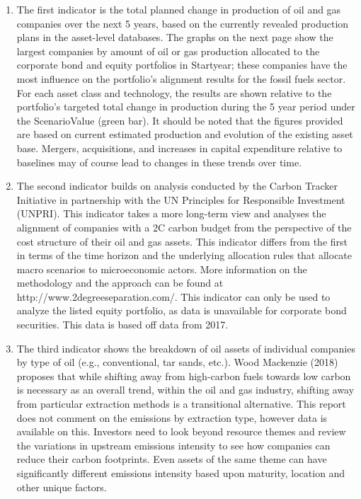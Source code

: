 \documentclass[10pt,table,a4]{article}\usepackage[]{graphicx}\usepackage[]{color}
\begin{document}
\begin{multicols}{2}
		\begin{enumerate}
			\item The first indicator is the total planned change in production of oil and gas companies over the next 5 years, based on the currently revealed production plans in the asset-level databases. The graphs on the next page show the largest companies by amount of oil or gas production allocated to the corporate bond and equity portfolios in Startyear; these companies have the most influence on the portfolio's alignment results for the fossil fuels sector. For each asset class and technology, the results are shown relative to the portfolio's targeted total change in production during the 5 year period under the ScenarioValue (green bar). It should be noted that the figures provided are based on current estimated production and evolution of the existing asset base. Mergers, acquisitions, and increases in capital expenditure relative to baselines may of course lead to changes in these trends over time. 
			\item The second indicator builds on analysis conducted by the Carbon Tracker Initiative in partnership with the UN Principles for Responsible Investment (UNPRI). This indicator takes a more long-term view and analyses the alignment of companies with a 2\degree C carbon budget from the perspective of the cost structure of their oil and gas assets. This indicator differs from the first in terms of the time horizon and the underlying allocation rules that allocate macro scenarios to microeconomic actors. More information on the methodology and the approach can be found at http://www.2degreeseparation.com/. This indicator can only be used to analyze the listed equity portfolio, as data is unavailable for corporate bond securities. This data is based off data from 2017. 
			\item The third indicator shows the breakdown of oil assets of individual companies by type of oil (e.g., conventional, tar sands, etc.). Wood Mackenzie (2018) proposes that while shifting away from high-carbon fuels towards low carbon is necessary as an overall trend, within the oil and gas industry, shifting away from particular extraction methods is a transitional alternative. This report does not comment on the emissions by extraction type, however data is available on this. Investors need to look beyond resource themes and review the variations in upstream emissions intensity to see how companies can reduce their carbon footprints. Even assets of the same theme can have significantly different emissions intensity based upon maturity, location and other unique factors.
		\end{enumerate}
			

\end{multicols}
\end{document}
